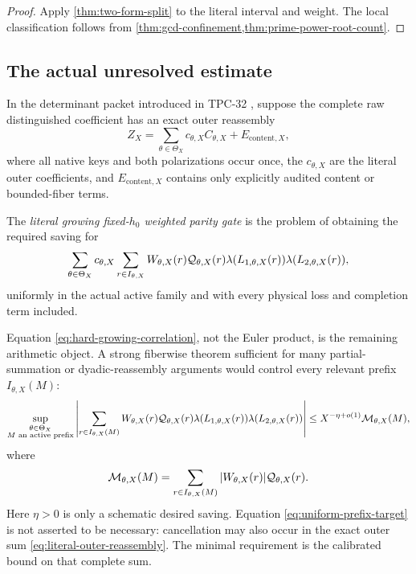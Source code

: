 \begin{proof}
Apply \cref{thm:two-form-split} to the literal interval and weight.
The local classification follows from
\cref{thm:gcd-confinement,thm:prime-power-root-count}.
\end{proof}

\subsection{The actual unresolved estimate}

In the determinant packet introduced in TPC-32
\citep{WangTPC32}, suppose the complete raw distinguished coefficient
has an exact outer reassembly
\begin{equation}
 Z_X
 =
 \sum_{\theta\in\Theta_X}
 c_{\theta,X}C_{\theta,X}
 +E_{\mathrm{content},X},
\label{eq:literal-outer-reassembly}
\end{equation}
where all native keys and both polarizations occur once, the
\(c_{\theta,X}\) are the literal outer coefficients, and
\(E_{\mathrm{content},X}\) contains only explicitly audited content
or bounded-fiber terms.

\begin{definition}
\label{def:growing-parity-gate}
The \emph{literal growing fixed-\(h_0\) weighted parity gate} is the
problem of obtaining the required saving for
\begin{equation}
 \sum_{\theta\in\Theta_X}c_{\theta,X}
 \sum_{r\in I_{\theta,X}}
 W_{\theta,X}(r)\mathcal Q_{\theta,X}(r)
 \lambda(L_{1,\theta,X}(r))
 \lambda(L_{2,\theta,X}(r)),
\label{eq:hard-growing-correlation}
\end{equation}
uniformly in the actual active family and with every physical loss
and completion term included.
\end{definition}

Equation \eqref{eq:hard-growing-correlation}, not the Euler product,
is the remaining arithmetic object.  A strong fiberwise theorem
sufficient for many partial-summation or dyadic-reassembly arguments
would control every relevant prefix \(I_{\theta,X}(M)\):
\begin{equation}
 \sup_{\substack{\theta\in\Theta_X\\
                 M\text{ an active prefix}}}
 \left|
 \sum_{r\in I_{\theta,X}(M)}
 W_{\theta,X}(r)\mathcal Q_{\theta,X}(r)
 \lambda(L_{1,\theta,X}(r))
 \lambda(L_{2,\theta,X}(r))
 \right|
 \le
 X^{-\eta+o(1)}
 \mathcal M_{\theta,X}(M),
\label{eq:uniform-prefix-target}
\end{equation}
where
\[
 \mathcal M_{\theta,X}(M)
 =
 \sum_{r\in I_{\theta,X}(M)}
 |W_{\theta,X}(r)|\mathcal Q_{\theta,X}(r).
\]
Here \(\eta>0\) is only a schematic desired saving.
Equation \eqref{eq:uniform-prefix-target} is not asserted to be
necessary: cancellation may also occur in the exact outer sum
\eqref{eq:literal-outer-reassembly}.  The minimal requirement is the
calibrated bound on that complete sum.

